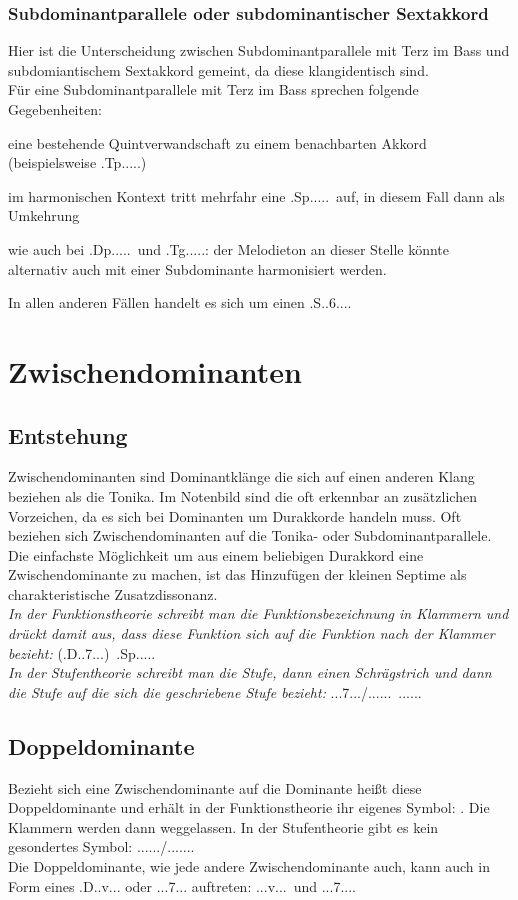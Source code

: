 \documentclass[a4paper]{article}
\newcommand{\dS}[1]{\HH.\uppercase\expandafter{\romannumeral #1\relax}.....} %
\newcommand{\dShoch}[4]{\HH.\uppercase\expandafter{\romannumeral #1\relax}..#2.#3.#4.} %
\newcommand{\Tp}{\HH.Tp.....}
\newcommand{\Tg}{\HH.Tg.....}
\newcommand{\Shoch}[2]{\HH.S.#2.#1...}
\newcommand{\Sp}{\HH.Sp.....}
\newcommand{\Dhoch}[2]{\HH.D.#2.#1...}
\newcommand{\Dhochv}[2]{\HH.\Ohne{D}.#2.#1...} %
\newcommand{\DDhoch}[2]{\HH.\DD.#2.#1...}
\newcommand{\DDhochv}[2]{\HH.\DDohne.#2.#1...}
\newcommand{\Dp}{\HH.Dp.....}
\begin{document}
	\subsubsection{Subdominantparallele oder subdominantischer Sextakkord}
	Hier ist die Unterscheidung zwischen Subdominantparallele mit Terz im Bass und subdomiantischem Sextakkord gemeint, da diese klangidentisch sind.\\
	Für eine Subdominantparallele mit Terz im Bass sprechen folgende Gegebenheiten:
	\begin{description}
		\item eine bestehende Quintverwandschaft zu einem benachbarten Akkord (beispielsweise \Tp)
		\item im harmonischen Kontext tritt mehrfahr eine \Sp\ auf, in diesem Fall dann als Umkehrung
		\item wie auch bei \Dp\ und \Tg: der Melodieton an dieser Stelle könnte alternativ auch mit einer Subdominante harmonisiert werden.
	\end{description}
	In allen anderen Fällen handelt es sich um einen \Shoch{6}{}.
	
	\section{Zwischendominanten}
	\subsection{Entstehung}
	Zwischendominanten sind Dominantklänge die sich auf einen anderen Klang beziehen als die Tonika.
	Im Notenbild sind die oft erkennbar an zusätzlichen Vorzeichen, da es sich bei Dominanten um Durakkorde handeln muss. Oft beziehen sich Zwischendominanten auf die Tonika- oder Subdominantparallele. Die einfachste Möglichkeit um aus einem beliebigen Durakkord eine Zwischendominante zu machen, ist das Hinzufügen der kleinen Septime als charakteristische Zusatzdissonanz.\\
	\textit{In der Funktionstheorie schreibt man die Funktionsbezeichnung in Klammern und drückt damit aus, dass diese Funktion sich auf die Funktion nach der Klammer bezieht:} (\Dhoch{7}{})\ \Sp\\
	\textit{In der Stufentheorie schreibt man die Stufe, dann einen Schrägstrich und dann die Stufe auf die sich die geschriebene Stufe bezieht:} \dShoch{5}{7}{}{}/\dS{2}\ \dS{2}
	
	\subsection{Doppeldominante}
	Bezieht sich eine Zwischendominante auf die Dominante heißt diese Doppeldominante und erhält in der Funktionstheorie ihr eigenes Symbol: \DD. Die Klammern werden dann weggelassen. In der Stufentheorie gibt es kein gesondertes Symbol: \dS{5}/\dS{5}.\\
	Die Doppeldominante, wie jede andere Zwischendominante auch, kann auch in Form eines \Dhoch{v}{} oder \Dhochv{7}{} auftreten: \DDhoch{v}{}\ und \DDhochv{7}{}.
	
\end{document}
